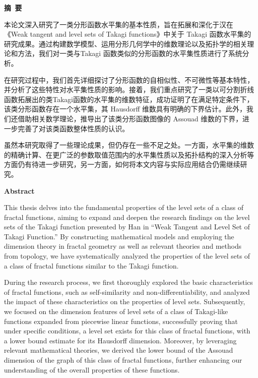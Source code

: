 \cleardoublepage{}
\begin{center}
    \bfseries {} 摘~要
\end{center}


本论文深入研究了一类分形函数水平集的基本性质，旨在拓展和深化于汉在《Weak tangent and level sets of Takagi functions》中关于 Takagi 函数水平集的研究成果。通过构建数学模型、运用分形几何学中的维数理论以及拓扑学的相关理论和方法，我们对一类与Takagi 函数类似的分形函数的水平集性质进行了系统分析。

在研究过程中，我们首先详细探讨了分形函数的自相似性、不可微性等基本特性，并分析了这些特性对水平集性质的影响。接着，我们重点研究了一类以可分割折线函数拓展出的类Takagi函数的水平集的维数特征，成功证明了在满足特定条件下，该类分形函数存在一个水平集，其 Hausdorff 维数具有明确的下界估计。此外，我们还借助相关数学理论，推导出了该类分形函数图像的 Assouad 维数的下界，进一步完善了对该类函数整体性质的认识。

虽然本研究取得了一些理论成果，但仍存在一些不足之处。一方面，水平集的维数的精确计算、在更广泛的参数取值范围内的水平集性质以及拓扑结构的深入分析等方面仍有待进一步研究，另一方面，如何将本文内容与实际应用结合仍需继续研究。

\cleardoublepage{}
\begin{center}
    \bfseries {} Abstract
\end{center}

This thesis delves into the fundamental properties of the level sets of a class of fractal functions, aiming to expand and deepen the research findings on the level sets of the Takagi function presented by Han in “Weak Tangent and Level Set of Takagi Function.” By constructing mathematical models and employing the dimension theory in fractal geometry as well as relevant theories and methods from topology, we have systematically analyzed the properties of the level sets of a class of fractal functions similar to the Takagi function.

During the research process, we first thoroughly explored the basic characteristics of fractal functions, such as self-similarity and non-differentiability, and analyzed the impact of these characteristics on the properties of level sets. Subsequently, we focused on the dimension features of level sets of a class of Takagi-like functions expanded from piecewise linear functions, successfully proving that under specific conditions, a level set exists for this class of fractal functions, with a lower bound estimate for its Hausdorff dimension. Moreover, by leveraging relevant mathematical theories, we derived the lower bound of the Assouad dimension of the graph of this class of fractal functions, further enhancing our understanding of the overall properties of these functions.

